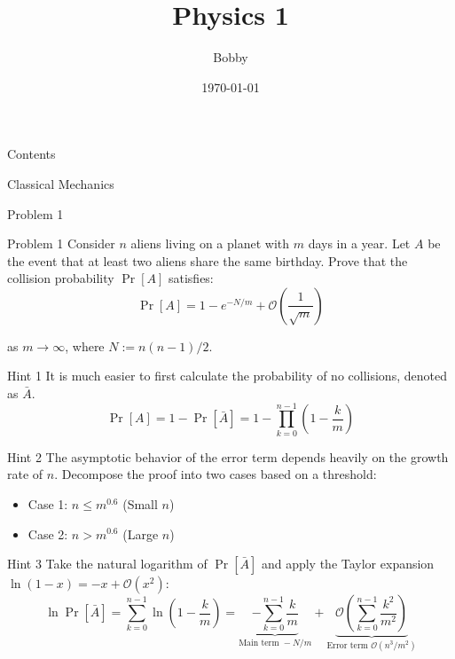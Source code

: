 \documentclass{beamer}
\title{Physics 1}
\author{Bobby}
\institute{IIIS, Tsinghua University}
\date{\today}
\begin{document}
\begin{frame}
    \titlepage
\end{frame}

\begin{frame}{Contents}
    \tableofcontents[hideallsubsections]
\end{frame}

\begin{section}{Classical Mechanics}

\begin{subsection}{Problem 1}
    \begin{frame}
        \begin{block}{Problem 1}
            Consider \(n\) aliens living on a planet with \(m\) days in a year. Let \(A\) be the event that at least two aliens share the same birthday. Prove that the collision probability $\Pr[A]$ satisfies:
            \[\Pr[A] = 1 - e^{-N/m} + \mathcal{O}\left(\frac{1}{\sqrt{m}}\right)\]

            as \(m \to \infty\), where \(N := n(n-1)/2\).    
        \end{block}
    \end{frame}

    \begin{frame}
        \begin{block}{Hint 1}
            It is much easier to first calculate the probability of no collisions, denoted as $\bar{A}$.
            \[
                \Pr[A] = 1 - \Pr[\bar{A}] = 1 - \prod_{k=0}^{n-1} \left(1 - \frac{k}{m}\right)
            \]
        \end{block}

        \pause
        \vspace{2em}
        \begin{block}{Hint 2}
            The asymptotic behavior of the error term depends heavily on the growth rate of $n$. Decompose the proof into two cases based on a threshold:
            \begin{itemize}
                \item Case 1: $n \le m^{0.6}$ (Small $n$)
                \item Case 2: $n > m^{0.6}$ (Large $n$)
            \end{itemize}
        \end{block}

    \end{frame}

    \begin{frame}
        \begin{block}{Hint 3}
            Take the natural logarithm of $\Pr[\bar{A}]$ and apply the Taylor expansion $\ln(1-x) = -x + \mathcal{O}(x^2)$:
            \[
                \ln \Pr[\bar{A}] = \sum_{k=0}^{n-1} \ln\left(1 - \frac{k}{m}\right) = \underbrace{-\sum_{k=0}^{n-1} \frac{k}{m}}_{\text{Main term } -N/m} + \underbrace{\mathcal{O}\left(\sum_{k=0}^{n-1} \frac{k^2}{m^2}\right)}_{\text{Error term } \mathcal{O}(n^3/m^2)}
            \]
        \end{block}
    \end{frame} 


\end{subsection}
\end{section}
\end{document}
